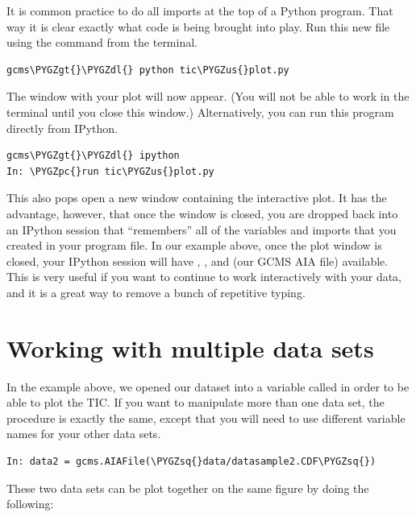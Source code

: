 \documentclass[letterpaper,10pt,english]{sphinxmanual}
\def\PYGZus{\char`\_}
\def\PYGZgt{\char`\>}
\def\PYGZpc{\char`\%}
\def\PYGZdl{\char`\$}
\def\PYGZsq{\char`\'}
\begin{document}
It is common practice to do all imports at the top of a Python program. That
way it is clear exactly what code is being brought into play. Run this new
file using the  command from the terminal.

\begin{Verbatim}[commandchars=\\\{\}]
gcms\PYGZgt{}\PYGZdl{} python tic\PYGZus{}plot.py
\end{Verbatim}

The window with your plot will now appear. (You will not be able to work in the
terminal until you close this window.) Alternatively, you can run this program
directly from IPython.

\begin{Verbatim}[commandchars=\\\{\}]
gcms\PYGZgt{}\PYGZdl{} ipython
In: \PYGZpc{}run tic\PYGZus{}plot.py
\end{Verbatim}

This also pops open a new window containing the interactive plot. It has the
advantage, however, that once the window is closed, you are dropped back into
an IPython session that ``remembers'' all of the variables and imports that you
created in your program file. In our example above, once the plot window is
closed, your IPython session will have , , and  (our
GCMS AIA file) available.  This is very useful if you want to continue to work
interactively with your data, and it is a great way to remove a bunch of
repetitive typing.


\section{Working with multiple data sets}
\label{basics:working-with-multiple-data-sets}
In the example above, we opened our dataset into a variable called  in
order to be able to plot the TIC. If you want to manipulate more than one data
set, the procedure is exactly the same, except that you will need to use
different variable names for your other data sets.

\begin{Verbatim}[commandchars=\\\{\}]
In: data2 = gcms.AIAFile(\PYGZsq{}data/datasample2.CDF\PYGZsq{})
\end{Verbatim}

These two data sets can be plot together on the same figure by doing the
following:
\end{document}

